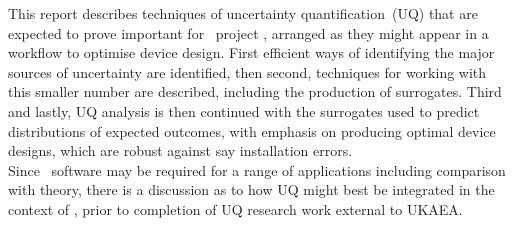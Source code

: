 This report describes techniques of uncertainty quantification~(UQ) that are expected
to prove important for \exc\ project \nep, arranged as they might appear in a
workflow to optimise device design.
First efficient ways of identifying the major sources of uncertainty
are identified, then second, techniques for working with this smaller number are described,
including the production of surrogates.
Third and lastly, UQ analysis is then continued with the
surrogates used to predict distributions of expected outcomes,
with emphasis on producing optimal device designs, which are robust
against say installation errors.\\
Since \nep\ software
may be required for a range of applications including comparison with theory,
there is a discussion as to how UQ might best be integrated in the context of \nep, prior to completion
of UQ research work external to UKAEA.


